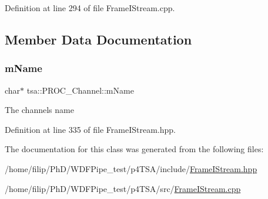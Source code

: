 Definition at line 294 of file Frame\+I\+Stream.\+cpp.



\subsection{Member Data Documentation}
\mbox{\label{classtsa_1_1_p_r_o_c___channel_a81ce6bd37c7c57c76da43519841e0c85}} 
\subsubsection{\texorpdfstring{m\+Name}{mName}}
{\footnotesize\ttfamily char$\ast$ tsa\+::\+P\+R\+O\+C\+\_\+\+Channel\+::m\+Name\hspace{0.3cm}{\ttfamily [private]}}

The channel\textquotesingle{}s name 

Definition at line 335 of file Frame\+I\+Stream.\+hpp.



The documentation for this class was generated from the following files\+:\begin{DoxyCompactItemize}
\item 
/home/filip/\+Ph\+D/\+W\+D\+F\+Pipe\+\_\+test/p4\+T\+S\+A/include/\hyperlink{_frame_i_stream_8hpp}{Frame\+I\+Stream.\+hpp}\item 
/home/filip/\+Ph\+D/\+W\+D\+F\+Pipe\+\_\+test/p4\+T\+S\+A/src/\hyperlink{_frame_i_stream_8cpp}{Frame\+I\+Stream.\+cpp}\end{DoxyCompactItemize}
